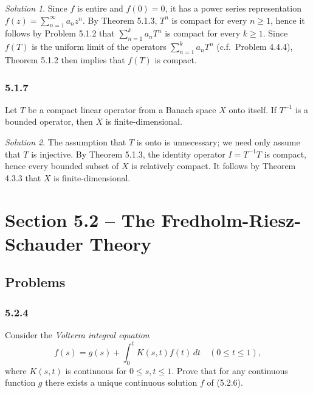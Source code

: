 \documentclass{report}
\theoremstyle{remark}
\newtheorem*{solution}{Solution}
\begin{document}
\begin{solution}
  Since $f$ is entire and $f(0) = 0$, it has a power series representation $f(z) = \sum_{n=1}^\infty a_n z^n$. By Theorem 5.1.3, $T^n$ is compact for every $n \ge 1$, hence it follows by Problem 5.1.2 that $\sum_{n=1}^k a_n T^n$ is compact for every $k \ge 1$. Since $f(T)$ is the uniform limit of the operators $\sum_{n=1}^k a_n T^n$ (c.f.\ Problem 4.4.4), Theorem 5.1.2 then implies that $f(T)$ is compact.
\end{solution}

\subsubsection*{5.1.7}
Let $T$ be a compact linear operator from a Banach space $X$ onto itself. If $T^{-1}$ is a bounded operator, then $X$ is finite-dimensional.

\begin{solution}
  The assumption that $T$ is onto is unnecessary; we need only assume that $T$ is injective. By Theorem 5.1.3, the identity operator $I = T^{-1} T$ is compact, hence every bounded subset of $X$ is relatively compact. It follows by Theorem 4.3.3 that $X$ is finite-dimensional.
\end{solution}


\section*{Section 5.2 -- The Fredholm-Riesz-Schauder Theory}

\subsection*{Problems}

\subsubsection*{5.2.4}
Consider the \emph{Volterra integral equation}
\begin{equation*}
  f(s) = g(s) + \int_0^t K(s,t) f(t) \, dt \quad (0 \le t \le 1), \tag{5.2.6}
\end{equation*}
where $K(s,t)$ is continuous for $0 \le s, t \le 1$. Prove that for any continuous function $g$ there exists a unique continuous solution $f$ of (5.2.6).
\end{document}
